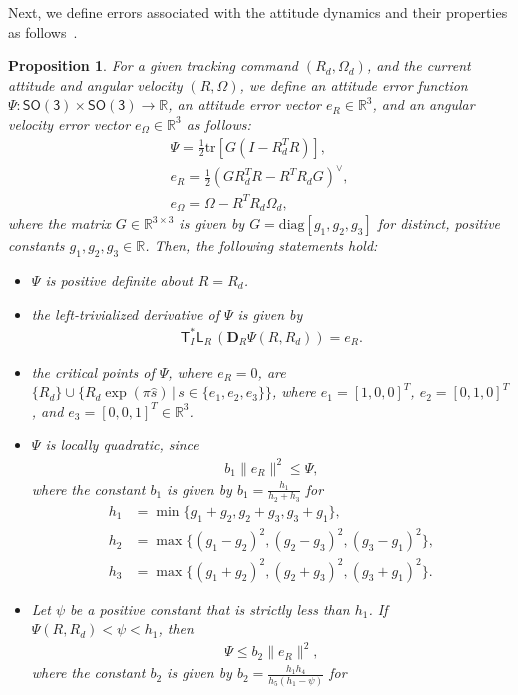 \documentclass[twocolumn,letterpaper]{IEEEAerospaceCLS}  %
\newcommand{\SO}{\ensuremath{\mathsf{SO(3)}}}
\newcommand{\T}{\ensuremath{\mathsf{T}}}
\renewcommand{\L}{\ensuremath{\mathsf{L}}}
\renewcommand{\Re}{\mathbb{R}}
\newcommand{\D}{\ensuremath{\mathbf{D}}}
\newtheorem{prop}{Proposition}
\begin{document}
Next, we define errors associated with the attitude dynamics and their properties as follows~\cite{BulLew05,LeeITCST13}.
\begin{prop}\label{prop:1}
For a given tracking command $(R_d,\Omega_d)$, and the current attitude and angular velocity $(R,\Omega)$, we define an attitude error function $\Psi:\SO\times\SO\rightarrow\Re$, an attitude error vector $e_R\in{\Re}^3$, and an angular velocity error vector $e_\Omega\in{\Re}^3$ as follows:
\begin{gather}
\Psi = \frac{1}{2}{\mathrm{tr}}[G(I-R_d^TR)],\label{eqn:Psi}\\
e_R =\frac{1}{2} (GR_d^TR-R^TR_dG)^\vee,\label{eqn:eR}\\
e_\Omega = \Omega - R^T R_d\Omega_d,\label{eqn:eW}
\end{gather}
where the matrix $G\in{\Re}^{3\times 3}$ is given by $G={\mathrm{diag}}[g_1,g_2,g_3]$ for distinct, positive constants $g_1,g_2,g_3\in\Re$. Then, the following statements hold:
\begin{itemize}
\item[(i)] $\Psi$ is positive definite about $R=R_d$.
\item[(ii)] the left-trivialized derivative of $\Psi$ is given by
\begin{align}
{\T}^*_I {\L}_R\, ({\D}_R\Psi(R,R_d))= e_R.
\end{align}
\item[(iii)] the critical points of $\Psi$, where $e_R=0$, are $\{R_d\}\cup\{R_d\exp (\pi \hat s)\,|\, s\in\{e_1,e_2,e_3\}\}$, where $e_1=[1,0,0]^T$, $e_2=[0,1,0]^T$, and $e_3=[0,0,1]^T\in{\Re}^3$. 
\item[(iv)] $\Psi$ is locally quadratic, since
\begin{align}
b_1\|e_R\|^2 \leq \Psi,\label{eqn:eRPsi}
\end{align}
where the constant $b_1$ is given by $b_1=\frac{h_1}{h_2+h_3}$ for 
\begin{align*}
h_1&= \min\{g_1+g_2,g_2+g_3,g_3+g_1 \},\\
h_2&=\max\{(g_1-g_2)^2,(g_2-g_3)^2,(g_3-g_1)^2\},\\
h_3&=\max\{(g_1+g_2)^2,(g_2+g_3)^2,(g_3+g_1)^2\}.
\end{align*}
\item[(v)] Let $\psi$ be a positive constant that is strictly less than $h_1$. If $\Psi(R,R_d)< \psi<h_1$, then
\begin{align}
\Psi\leq b_2 \|e_R\|^2,\label{eqn:eRPsi2}
\end{align}
where the constant $b_2$ is given by $b_2=\frac{h_1h_4}{h_5(h_1-\psi)}$ for 

\end{itemize}
\end{prop}
\end{document}
